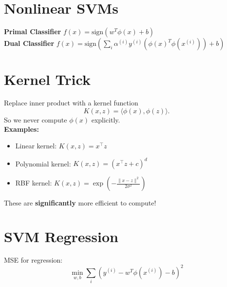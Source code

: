 \documentclass[11pt]{article}
\begin{document}
\pagebreak
\section*{Nonlinear SVMs}
\textbf{Primal Classifier} \(f(x) = \text{sign}(w^T \phi (x) + b)\) \\ 
\textbf{Dual Classifier} \(f(x) = \text{sign}\left( \sum_i \alpha^{(i)} y^{(i)} (\phi{(x)^T\phi{(x^{(i)})}}) + b \right)\) \\

\section*{Kernel Trick}

Replace inner product with a kernel function
\[
K(x,z) = \langle \phi(x), \phi(z)\rangle.
\]
So we never compute $\phi(x)$ explicitly. \\

\textbf{Examples:}
\begin{itemize}
    \item Linear kernel: $K(x,z) = x^\top z$
    \item Polynomial kernel: $K(x,z) = (x^\top z + c)^d$
    \item RBF kernel: $K(x,z) = \exp\!\left(-\tfrac{\|x-z\|^2}{2\sigma^2}\right)$
\end{itemize}
These are \textbf{significantly} more efficient to compute!

\pagebreak

\section*{SVM Regression}
MSE for regression:
\[
\min_{w,b} \sum_i (y^{(i)} - w^T \phi{(x^{(i)})} - b)^2
\]
\end{document}
